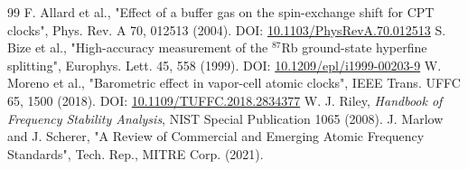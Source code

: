 \documentclass[11pt,a4paper]{article}
\begin{document}
\begin{thebibliography}{99}
 F. Allard et al., "Effect of a buffer gas on the spin-exchange shift for CPT clocks", Phys. Rev. A 70, 012513 (2004). DOI: \href{https://doi.org/10.1103/PhysRevA.70.012513}{10.1103/PhysRevA.70.012513}
 S. Bize et al., "High-accuracy measurement of the $^{87}$Rb ground-state hyperfine splitting", Europhys. Lett. 45, 558 (1999). DOI: \href{https://doi.org/10.1209/epl/i1999-00203-9}{10.1209/epl/i1999-00203-9}
 W. Moreno et al., "Barometric effect in vapor-cell atomic clocks", IEEE Trans. UFFC 65, 1500 (2018). DOI: \href{https://doi.org/10.1109/TUFFC.2018.2834377}{10.1109/TUFFC.2018.2834377}
 W. J. Riley, \textit{Handbook of Frequency Stability Analysis}, NIST Special Publication 1065 (2008). 
 J. Marlow and J. Scherer, "A Review of Commercial and Emerging Atomic Frequency Standards", Tech. Rep., MITRE Corp. (2021).
\end{thebibliography}
\end{document}
